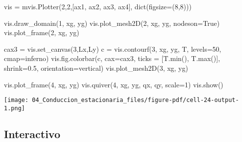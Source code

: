 \documentclass[
  letterpaper,
  DIV=11,
  numbers=noendperiod]{scrreprt}
\newenvironment{Shaded}{\begin{snugshade}}{\end{snugshade}}
\newcommand{\BuiltInTok}[1]{\textcolor[rgb]{0.00,0.23,0.31}{#1}}
\newcommand{\DecValTok}[1]{\textcolor[rgb]{0.68,0.00,0.00}{#1}}
\newcommand{\FloatTok}[1]{\textcolor[rgb]{0.68,0.00,0.00}{#1}}
\newcommand{\NormalTok}[1]{\textcolor[rgb]{0.00,0.23,0.31}{#1}}
\newcommand{\OperatorTok}[1]{\textcolor[rgb]{0.37,0.37,0.37}{#1}}
\newcommand{\StringTok}[1]{\textcolor[rgb]{0.13,0.47,0.30}{#1}}
\newcommand{\VariableTok}[1]{\textcolor[rgb]{0.07,0.07,0.07}{#1}}
\begin{document}
\begin{Shaded}
\begin{Highlighting}[]
\NormalTok{vis }\OperatorTok{=}\NormalTok{ mvis.Plotter(}\DecValTok{2}\NormalTok{,}\DecValTok{2}\NormalTok{,[ax1, ax2, ax3, ax4],}
                  \BuiltInTok{dict}\NormalTok{(figsize}\OperatorTok{=}\NormalTok{(}\DecValTok{8}\NormalTok{,}\DecValTok{8}\NormalTok{)))}

\NormalTok{vis.draw\_domain(}\DecValTok{1}\NormalTok{, xg, yg)}
\NormalTok{vis.plot\_mesh2D(}\DecValTok{2}\NormalTok{, xg, yg, nodeson}\OperatorTok{=}\VariableTok{True}\NormalTok{)}
\NormalTok{vis.plot\_frame(}\DecValTok{2}\NormalTok{, xg, yg)}

\NormalTok{cax3 }\OperatorTok{=}\NormalTok{ vis.set\_canvas(}\DecValTok{3}\NormalTok{,Lx,Ly)}
\NormalTok{c }\OperatorTok{=}\NormalTok{ vis.contourf(}\DecValTok{3}\NormalTok{, xg, yg, T, levels}\OperatorTok{=}\DecValTok{50}\NormalTok{, cmap}\OperatorTok{=}\StringTok{\textquotesingle{}inferno\textquotesingle{}}\NormalTok{)}
\NormalTok{vis.fig.colorbar(c, cax}\OperatorTok{=}\NormalTok{cax3, ticks }\OperatorTok{=}\NormalTok{ [T.}\BuiltInTok{min}\NormalTok{(), T.}\BuiltInTok{max}\NormalTok{()], shrink}\OperatorTok{=}\FloatTok{0.5}\NormalTok{, orientation}\OperatorTok{=}\StringTok{\textquotesingle{}vertical\textquotesingle{}}\NormalTok{)}
\NormalTok{vis.plot\_mesh2D(}\DecValTok{3}\NormalTok{, xg, yg)}

\NormalTok{vis.plot\_frame(}\DecValTok{4}\NormalTok{, xg, yg)}
\NormalTok{vis.quiver(}\DecValTok{4}\NormalTok{, xg, yg, qx, qy, scale}\OperatorTok{=}\DecValTok{1}\NormalTok{)}
\NormalTok{vis.show()}
\end{Highlighting}
\end{Shaded}

\texttt{[image: 04\_Conduccion\_estacionaria\_files/figure-pdf/cell-24-output-1.png]}

\subsection{Interactivo}\label{interactivo}
\end{document}
